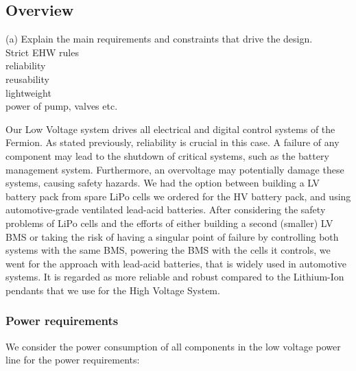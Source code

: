 \subsection{Overview}
(a) Explain the main requirements and constraints that drive the design. \\
Strict EHW rules \\
reliability \\
reusability \\
lightweight \\
power of pump, valves etc. 

\par Our Low Voltage system drives all electrical and digital control systems of the Fermion. As stated previously,
reliability is crucial in this case. A failure of any component may lead to the shutdown of critical systems, such as the battery management system.
Furthermore, an overvoltage may potentially damage these systems, causing safety hazards. We had the option between building a LV battery pack from spare LiPo cells we ordered for the HV battery pack, and using automotive-grade ventilated lead-acid batteries.
After considering the safety problems of LiPo cells and the efforts of either building a second (smaller) LV BMS or taking the risk of having a singular point of failure by controlling both systems with the same BMS, powering the BMS with the cells it controls, we went for the approach with lead-acid batteries, that is widely used in automotive systems. It is regarded as more reliable and robust compared to the Lithium-Ion pendants that we use for the High Voltage System. \\
\subsubsection*{Power requirements}
We consider the power consumption of all components in the low voltage power line for the power requirements:

